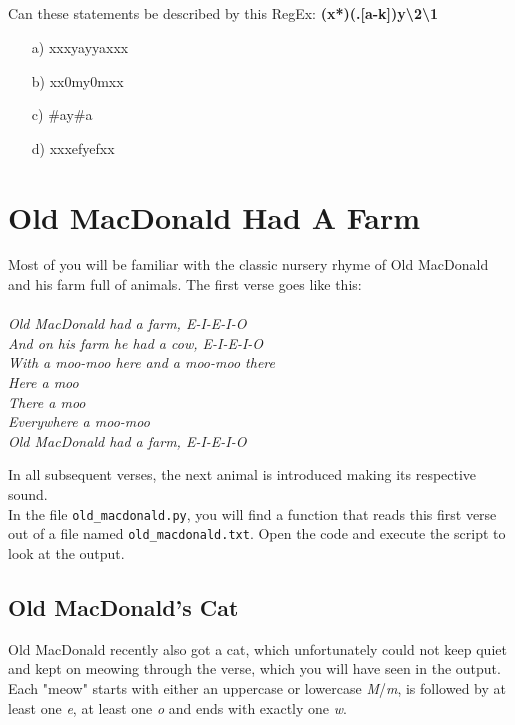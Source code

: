 \subsection{}
Can these statements be described by this RegEx: \textbf{(x*)(.[a-k])y\textbackslash2\textbackslash1}
\begin{itemize}
\item[a)] xxxyayyaxxx 
\item[b)] xx0my0mxx 
\item[c)] \#ay\#a 
\item[d)] xxxefyefxx 
\end{itemize}


\section{Old MacDonald Had A Farm}
Most of you will be familiar with the classic nursery rhyme of Old MacDonald and his farm full of animals. The first verse goes like this:\\\\
\textit{Old MacDonald had a farm, E-I-E-I-O\\
And on his farm he had a cow, E-I-E-I-O\\
With a moo-moo here and a moo-moo there\\
Here a moo\\
There a moo\\
Everywhere a moo-moo\\
Old MacDonald had a farm, E-I-E-I-O\\
}

\noindent In all subsequent verses, the next animal is introduced making its respective sound.\\
In the file \texttt{old\_macdonald.py}, you will find a function that reads this first verse out of a file named \texttt{old\_macdonald.txt}. Open the code and execute the script to look at the output.

\subsection{Old MacDonald's Cat}
Old MacDonald recently also got a cat, which unfortunately could not keep quiet and kept on meowing through the verse, which you will have seen in the output.\\
Each "meow" starts with either an uppercase or lowercase \textit{M}/\textit{m}, is followed by at least one \textit{e}, at least one \textit{o} and ends with exactly one \textit{w}.\\

